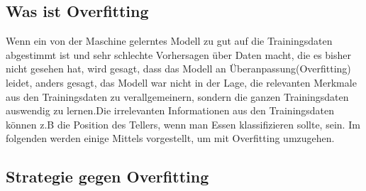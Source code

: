 \documentclass[12pt,a4paper]{scrartcl}
\numberwithin{equation}{section}
\begin{document}
 \subsection{Was ist Overfitting}
 Wenn ein von der Maschine gelerntes Modell zu gut auf die Trainingsdaten abgestimmt ist und sehr schlechte Vorhersagen über Daten macht, die es bisher nicht gesehen hat, wird gesagt, dass das Modell an Überanpassung(Overfitting) leidet, anders gesagt, das Modell war nicht in der Lage, die relevanten Merkmale aus den Trainingsdaten zu verallgemeinern, sondern die ganzen Trainingsdaten auswendig zu lernen.Die irrelevanten Informationen aus den Trainingsdaten können z.B die Position des Tellers, wenn man Essen klassifizieren sollte, sein. Im folgenden werden einige Mittels vorgestellt, um mit Overfitting umzugehen.
 \subsection{Strategie gegen Overfitting}
\end{document}
